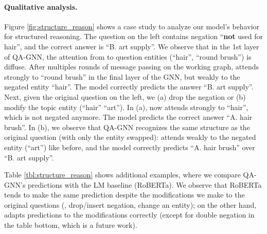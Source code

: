 \paragraph{Qualitative analysis.}


Figure \ref{fig:structure_reason} shows a case study to analyze our model's behavior for structured reasoning. 
The question on the left contains negation ``\textbf{not} used for hair'', and the correct answer is ``B. art supply''.
We observe that in the 1st layer of QA-GNN, the attention from  to question entities (``hair'', ``round brush'') is diffuse. After multiples rounds of message passing on the working graph,  attends strongly to ``round brush'' in the final layer of the GNN, but weakly to the negated entity ``hair''. The model correctly predicts the answer ``B. art supply''.
Next, given the original question on the left, we (a) drop the negation or (b) modify the topic entity (``hair''  ``art'').
In (a),  now attends strongly to ``hair'', which is not negated anymore. The model predicts the correct answer ``A. hair brush''.
In (b), we observe that QA-GNN recognizes the same structure as the original question (with only the entity swapped):  attends weakly to the negated entity (``art'') like before, and the model correctly predicts ``A. hair brush'' over ``B. art supply''.


Table \ref{tbl:structure_reason} shows additional examples, where we compare QA-GNN's predictions with the LM baseline (RoBERTa).
We observe that RoBERTa tends to make the same prediction despite the modifications we make to the original questions (\eg, drop/insert negation, change an entity); on the other hand, \methodname adapts predictions to the modifications correctly (except for double negation in the table bottom, which is a future work). 




